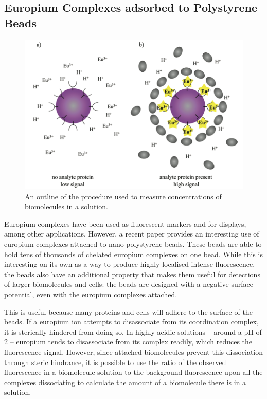 \subsection{Europium Complexes adsorbed to Polystyrene Beads}\label{subsec:eu_beads}

\begin{figure}
\begin{center}
\includegraphics[width=\textwidth]{figures/eu_beads.png}
\end{center}
\caption{An outline of the procedure used to measure concentrations of biomolecules in a solution.}
\label{fig:eu_beads}
\end{figure}

Europium complexes have been used as fluorescent markers and for displays,
among other applications. However, a recent paper provides an interesting use
of europium complexes attached to nano polystyrene beads. These beads are able
to hold tens of thousands of chelated europium complexes on one bead. While
this is interesting on its own as a way to produce highly localised intense
fluorescence, the beads also have an additional property that makes them useful
for detections of larger biomolecules and cells: the beads are designed with a
negative surface potential, even with the europium complexes attached.

This is useful because many proteins and cells will adhere to the surface of
the beads. If a europium ion attempts to disassociate from its coordination
complex, it is sterically hindered from doing so. In highly acidic solutions --
around a pH of 2 -- europium tends to disassociate from its complex readily,
which reduces the fluorescence signal. However, since attached biomolecules
prevent this dissociation through steric hindrance, it is possible to use the
ratio of the observed fluorescence in a biomolecule solution to the background
fluorescence upon all the complexes dissociating to calculate the amount of a
biomolecule there is in a solution.

